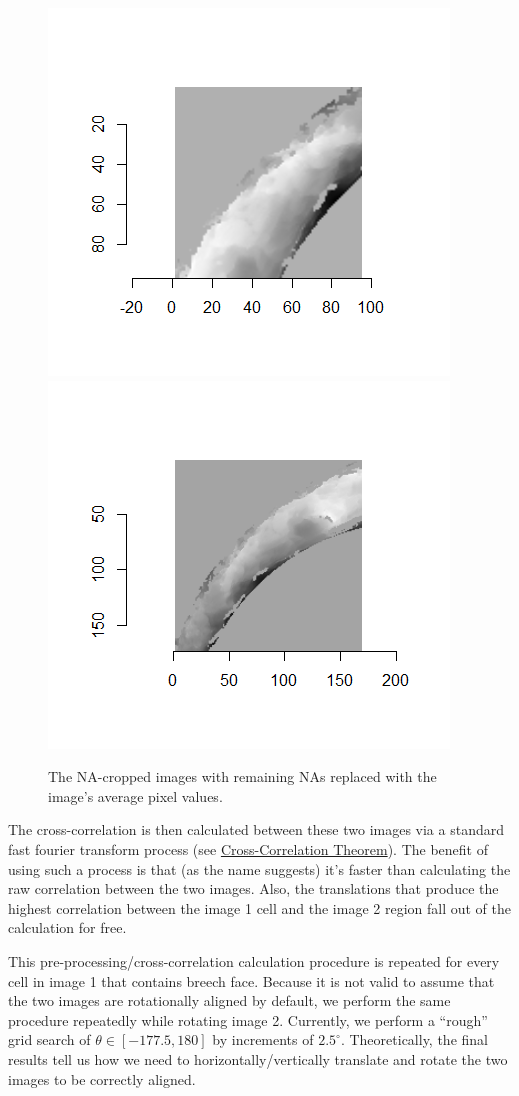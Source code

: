 \documentclass[]{book}
\begin{document}
\begin{figure}

{\centering \includegraphics[width=0.5\linewidth]{images/joeZ/im1_splitShifted} \includegraphics[width=0.5\linewidth]{images/joeZ/im2_splitShifted} 

}

\caption{The NA-cropped images with remaining NAs replaced with the image's average pixel values.}\label{fig:unnamed-chunk-9}
\end{figure}

The cross-correlation is then calculated between these two images via a standard fast fourier transform process (see \href{http://mathworld.wolfram.com/Cross-CorrelationTheorem.html}{Cross-Correlation Theorem}). The benefit of using such a process is that (as the name suggests) it's faster than calculating the raw correlation between the two images. Also, the translations that produce the highest correlation between the image 1 cell and the image 2 region fall out of the calculation for free.

This pre-processing/cross-correlation calculation procedure is repeated for every cell in image 1 that contains breech face. Because it is not valid to assume that the two images are rotationally aligned by default, we perform the same procedure repeatedly while rotating image 2. Currently, we perform a ``rough'' grid search of \(\theta \in [-177.5,180]\) by increments of \(2.5^{\circ}\). Theoretically, the final results tell us how we need to horizontally/vertically translate and rotate the two images to be correctly aligned.
\end{document}

